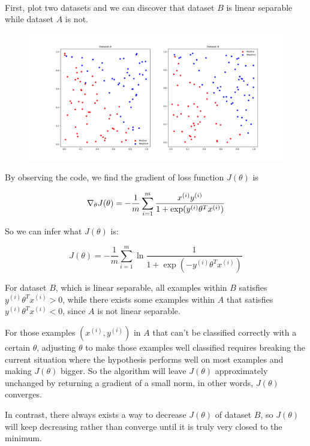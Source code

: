 \begin{answer}
	\\
	First, plot two datasets and we can discover that dataset $B$ is linear separable while dataset $A$ is not.
	
	\begin{figure}[h]
		\centering
		\includegraphics[width=0.7\linewidth]{01-stability/assets/datasets}
		\caption{}
		\label{fig:datasets}
	\end{figure}
	
	By observing the code, we find the gradient of loss function $J(\theta)$ is
	
	$$
	\nabla_{\theta} J(\theta) = -\frac{1}{m}\sum_{i = 1}^m \frac{x^{(i)}y^{(i)}}{1 + \exp(y^{(i)} \theta^T x^{(i)})}\\
	$$
	
	So we can infer what $J(\theta)$ is:
	
	$$
	J(\theta) = -\frac{1}{m}\sum_{i=1}^{m} \ln\frac{1}{1 + \exp(-y^{(i)} \theta^T x^{(i)})}
	$$
	
	For dataset $B$, which is linear separable, all examples within $B$ satisfies $y^{(i)}\theta^T x^{(i)}>0$, while there exists some examples within $A$ that satisfies $y^{(i)}\theta^T x^{(i)}<0$, since $A$ is not linear separable.
	
	For those examples $(x^{(i)}, y^{(i)})$ in $A$ that can't be classified correctly with a certain $\theta$, adjusting $\theta$ to make those examples well classified requires breaking the current situation where the hypothesis performs well on most examples and making $J(\theta)$ bigger. So the algorithm will leave $J(\theta)$ approximately unchanged by returning a gradient of a small norm, in other words, $J(\theta)$ converges.
	
	In contrast, there always exists a way to decrease $J(\theta)$ of dataset $B$, so $J(\theta)$ will keep decreasing rather than converge until it is truly very closed to the minimum.
\end{answer}
